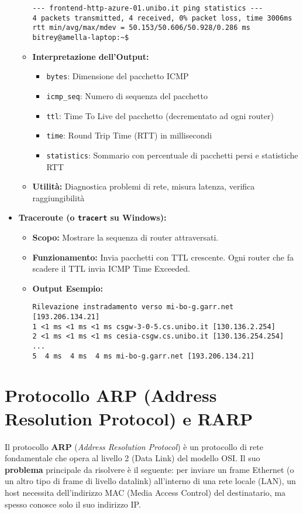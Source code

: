 \begin{itemize}
\begin{itemize}
\begin{verbatim}
--- frontend-http-azure-01.unibo.it ping statistics ---
4 packets transmitted, 4 received, 0% packet loss, time 3006ms
rtt min/avg/max/mdev = 50.153/50.606/50.928/0.286 ms
bitrey@amella-laptop:~$ 
\end{verbatim}
        \item \textbf{Interpretazione dell'Output:}
        \begin{itemize}
            \item \texttt{bytes}: Dimensione del pacchetto ICMP
            \item \texttt{icmp\_seq}: Numero di sequenza del pacchetto
            \item \texttt{ttl}: Time To Live del pacchetto (decrementato ad ogni router)
            \item \texttt{time}: Round Trip Time (RTT) in millisecondi
            \item \texttt{statistics}: Sommario con percentuale di pacchetti persi e statistiche RTT
        \end{itemize}
        \item \textbf{Utilità:} Diagnostica problemi di rete, misura latenza, verifica raggiungibilità
    \end{itemize}
    \item \textbf{Traceroute (o \texttt{tracert} su Windows):}
    \begin{itemize}
        \item \textbf{Scopo:} Mostrare la sequenza di router attraversati.
        \item \textbf{Funzionamento:} Invia pacchetti con TTL crescente. Ogni router che fa scadere il TTL invia ICMP Time Exceeded.
        \item \textbf{Output Esempio:}
\begin{verbatim}
Rilevazione instradamento verso mi-bo-g.garr.net [193.206.134.21]
1 <1 ms <1 ms <1 ms csgw-3-0-5.cs.unibo.it [130.136.2.254]
2 <1 ms <1 ms <1 ms cesia-csgw.cs.unibo.it [130.136.254.254]
...
5  4 ms  4 ms  4 ms mi-bo-g.garr.net [193.206.134.21]
\end{verbatim}
    \end{itemize}
\end{itemize}


\section{Protocollo ARP (Address Resolution Protocol) e RARP}
\label{sec:arp_combined}

Il protocollo \textbf{ARP} (\textit{Address Resolution Protocol}) è un protocollo di rete fondamentale che opera al livello 2 (Data Link) del modello OSI. Il suo \textbf{problema} principale da risolvere è il seguente: per inviare un frame Ethernet (o un altro tipo di frame di livello datalink) all'interno di una rete locale (LAN), un host necessita dell'indirizzo MAC (Media Access Control) del destinatario, ma spesso conosce solo il suo indirizzo IP.

